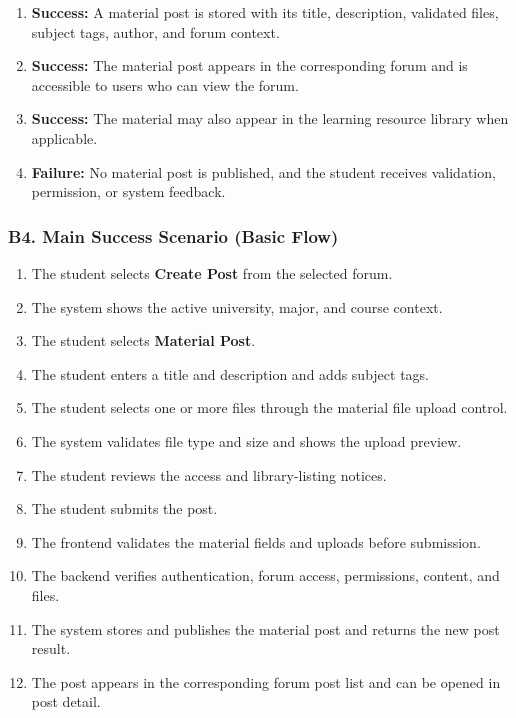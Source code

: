 \documentclass[12pt]{article}
\begin{document}
\begin{enumerate}
\item \textbf{Success:} A material post is stored with its title, description, validated files, subject tags, author, and forum context.
\item \textbf{Success:} The material post appears in the corresponding forum and is accessible to users who can view the forum.
\item \textbf{Success:} The material may also appear in the learning resource library when applicable.
\item \textbf{Failure:} No material post is published, and the student receives validation, permission, or system feedback.
\end{enumerate}
\par\medskip

\hypertarget{sec:b4-main-success-scenario-basic-flow}{}
\subsubsection*{B4. Main Success Scenario (Basic Flow)}
\par\medskip

\begin{enumerate}
\item The student selects \textbf{Create Post} from the selected forum.
\item The system shows the active university, major, and course context.
\item The student selects \textbf{Material Post}.
\item The student enters a title and description and adds subject tags.
\item The student selects one or more files through the material file upload control.
\item The system validates file type and size and shows the upload preview.
\item The student reviews the access and library-listing notices.
\item The student submits the post.
\item The frontend validates the material fields and uploads before submission.
\item The backend verifies authentication, forum access, permissions, content, and files.
\item The system stores and publishes the material post and returns the new post result.
\item The post appears in the corresponding forum post list and can be opened in post detail.
\end{enumerate}
\par\medskip
\end{document}
